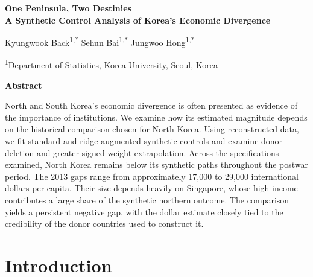 \documentclass[12pt]{article}
\begin{document}
\hypersetup{pageanchor=false}
\begin{titlepage}
\begin{center}
\vspace*{1.5cm}

{\Large\bfseries
One Peninsula, Two Destinies\\[0.4em]
A Synthetic Control Analysis of Korea's Economic Divergence\par
}

\vspace{1cm}

{\large
Kyungwook Back\textsuperscript{1,*}\quad
Sehun Bai\textsuperscript{1,*}\quad
Jungwoo Hong\textsuperscript{1,*}\par
}

\vspace{0.3cm}

{\small
\textsuperscript{1}Department of Statistics,
Korea University, Seoul, Korea\par
}

\vspace{1cm}
\textbf{Abstract}
\end{center}

\begingroup
\renewcommand{\thefootnote}{\fnsymbol{footnote}}
\endgroup
North and South Korea's economic divergence is often presented as evidence of the importance of institutions. We examine how its estimated magnitude depends on the historical comparison chosen for North Korea. Using reconstructed data, we fit standard and ridge-augmented synthetic controls and examine donor deletion and greater signed-weight extrapolation. Across the specifications examined, North Korea remains below its synthetic paths throughout the postwar period. The 2013 gaps range from approximately 17,000 to 29,000 international dollars per capita. Their size depends heavily on Singapore, whose high income contributes a large share of the synthetic northern outcome. The comparison yields a persistent negative gap, with the dollar estimate closely tied to the credibility of the donor countries used to construct it.

\vfill
\end{titlepage}
\setcounter{page}{1}
\hypersetup{pageanchor=true}

\section{Introduction}
\end{document}
